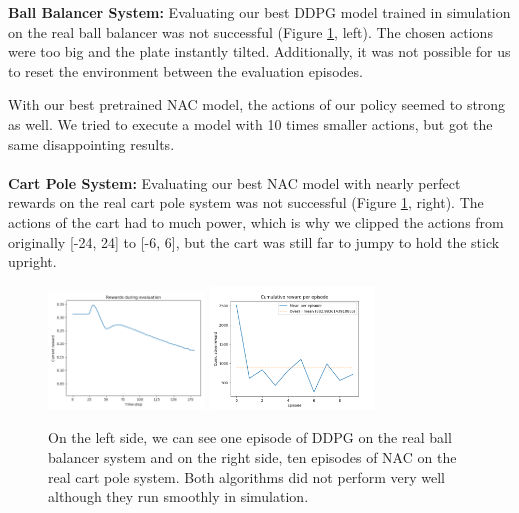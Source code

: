 \textbf{Ball Balancer System:} Evaluating our best DDPG model trained in simulation on the real ball balancer was not successful (Figure \ref{fig:rr}, left). The chosen actions were too big and the plate instantly tilted. Additionally, it was not possible for us to reset the environment between the evaluation episodes.

With our best pretrained NAC model, the actions of our policy seemed to strong as well. We tried to execute a model with 10 times smaller actions, but got the same disappointing results.
\\\\
\textbf{Cart Pole System:} Evaluating our best NAC model with nearly perfect rewards on the real cart pole system was not successful (Figure \ref{fig:rr}, right). The actions of the cart had to much power, which is why we clipped the actions from originally [-24, 24] to [-6, 6], but the cart was still far to jumpy to hold the stick upright.

\begin{figure}
	\centering
	
	\includegraphics[width=0.37\textwidth]{plots/RR_DDPG_BB_single.png}
	\includegraphics[width=0.39\textwidth]{plots/RR_NAC_CP_10episodes.png}
	
	\caption{On the left side, we can see one episode of DDPG on the real ball balancer system and on the right side, ten episodes of NAC on the real cart pole system. Both algorithms did not perform very well although they run smoothly in simulation.}
	\label{fig:rr}
	
\end{figure}




